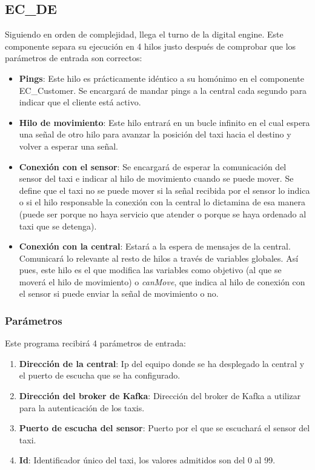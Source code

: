 \documentclass[a4paper,12pt]{article}
\begin{document}
\subsection{EC\_DE}
Siguiendo en orden de complejidad, llega el turno de la digital engine. Este componente separa su ejecución en 4 hilos
justo después de comprobar que los parámetros de entrada son correctos:
\begin{itemize}
  \item \textbf{Pings}: Este hilo es prácticamente idéntico a su homónimo en el componente EC\_Customer. Se encargará de mandar
        pings a la central cada segundo para indicar que el cliente está activo.
  \item \textbf{Hilo de movimiento}: Este hilo entrará en un bucle infinito en el cual espera una señal de otro hilo para
        avanzar la posición del taxi hacia el destino y volver a esperar una señal.
  \item \textbf{Conexión con el sensor}: Se encargará de esperar la comunicación del sensor del taxi e indicar al hilo de movimiento
        cuando se puede mover. Se define que el taxi no se puede mover si la señal recibida por el sensor lo indica o si el hilo responsable
        la conexión con la central lo dictamina de esa manera (puede ser porque no haya servicio que atender o porque se haya ordenado al taxi que se detenga).
  \item \textbf{Conexión con la central}: Estará a la espera de mensajes de la central. Comunicará lo relevante al resto de hilos a través de variables globales.
        Así pues, este hilo es el que modifica las variables como objetivo (al que se moverá el hilo de movimiento) o \textit{canMove}, que indica
        al hilo de conexión con el sensor si puede enviar la señal de movimiento o no.
\end{itemize}
\subsubsection{Parámetros}
Este programa recibirá 4 parámetros de entrada:
\begin{enumerate}
  \item \textbf{Dirección de la central}: Ip del equipo donde se ha desplegado la central y el puerto de escucha que
        se ha configurado.
  \item \textbf{Dirección del broker de Kafka}: Dirección del broker de Kafka a utilizar para la autenticación de los taxis.
  \item \textbf{Puerto de escucha del sensor}: Puerto por el que se escuchará el sensor del taxi.
  \item \textbf{Id}: Identificador único del taxi, los valores admitidos son del 0 al 99.
\end{enumerate}
\end{document}
